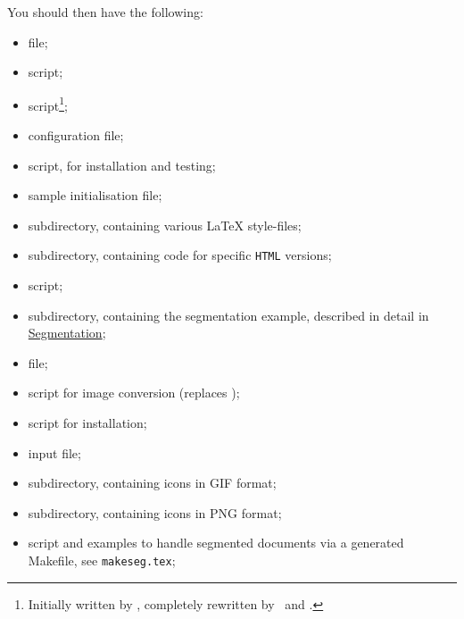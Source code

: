 \noindent
You should then have the following:
\begin{itemize}
\item {} file;
\item {} \Perl{} script;
\item {} \Perl{} script\footnote{Initially written 
by \RobertThau, completely rewritten by \Rouchal\ and \Lippmann.};
\item {} configuration file;
\item {} \Perl{} script, for installation and testing;
\item {} sample initialisation file;
%
\item {} subdirectory, containing various \LaTeX{} style-files;
\item {} subdirectory, containing code for specific
\texttt{HTML} versions;
\item {} \Perl{} script;
\item {} subdirectory, containing the segmentation example,
described in detail in 
\hyperref{a later section}{Section~}{}{Segmentation};
\item {} file;%
\item {} \Perl{} script for image conversion (replaces );
\item {} \Perl{} script for installation;
\item {} \Perl{} input file;
\item {} subdirectory, containing icons in GIF format;
\item {} subdirectory, containing icons in PNG format;
\item {} \Perl{} script and examples to handle segmented
documents via a generated Makefile, see \verb/makeseg.tex/;
\end{itemize}
